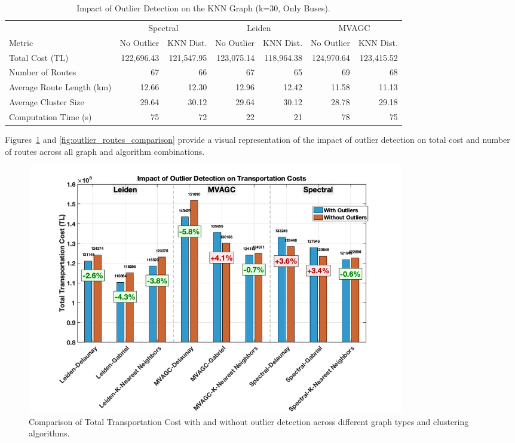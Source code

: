 \begin{table}[h]
\centering
\scriptsize{
\setlength{\tabcolsep}{4pt}
\begin{tabular}{lrrrrrr}
\toprule
& \multicolumn{2}{c}{Spectral} & \multicolumn{2}{c}{Leiden} & \multicolumn{2}{c}{MVAGC} \\
\cmidrule(lr){2-3} \cmidrule(lr){4-5} \cmidrule(lr){6-7}
Metric & No Outlier & KNN Dist. & No Outlier & KNN Dist. & No Outlier & KNN Dist. \\
\midrule
Total Cost (TL) & 122,696.43 & 121,547.95 & 123,075.14 & 118,964.38 & 124,970.64 & 123,415.52 \\
Number of Routes & 67 & 66 & 67 & 65 & 69 & 68 \\
Average Route Length (km) & 12.66 & 12.30 & 12.96 & 12.42 & 11.58 & 11.13 \\
Average Cluster Size & 29.64 & 30.12 & 29.64 & 30.12 & 28.78 & 29.18 \\
Computation Time (s) & 75 & 72 & 22 & 21 & 78 & 75 \\ 
\bottomrule
\end{tabular}
}
\caption{Impact of Outlier Detection on the KNN Graph (k=30, Only Buses).}
\label{tab:outlier_knn_results}
\end{table}

Figures~\ref{fig:outlier_cost_comparison} and \ref{fig:outlier_routes_comparison} provide a visual representation of the impact of outlier detection on total cost and number of routes across all graph and algorithm combinations.

\begin{figure}[h]
    \centering
    \includegraphics[width=0.8\textwidth]{img/outlier_cost_comparison}
    \caption{Comparison of Total Transportation Cost with and without outlier detection across different graph types and clustering algorithms.}
    \label{fig:outlier_cost_comparison}
\end{figure}

